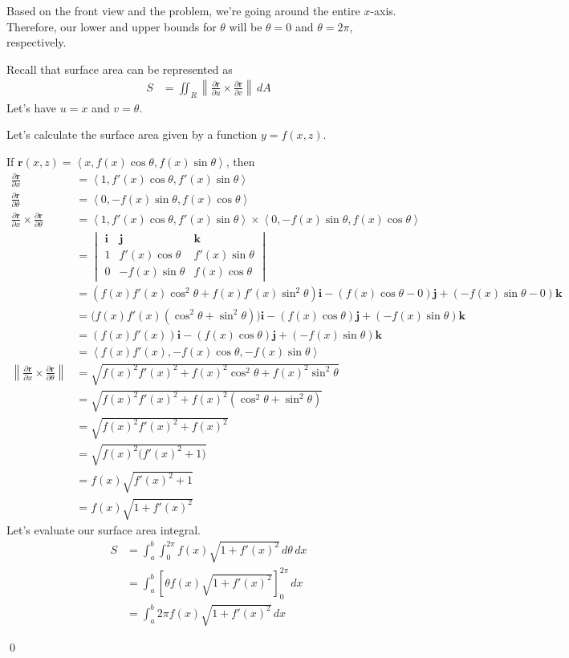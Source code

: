 \documentclass{article}
\newcommand{\lrp}[1]{\left( #1 \right)}
\newcommand{\lra}[1]{\left\langle #1 \right\rangle}
\newcommand{\lrb}[1]{\left[ #1 \right]}
\newcommand{\norm}[1]{\left\lVert #1 \right\rVert}
\renewcommand{\i}[0]{\mathbf{i}}
\renewcommand{\j}[0]{\mathbf{j}}
\renewcommand{\k}[0]{\mathbf{k}}
\renewcommand{\r}[0]{\mathbf{r}}
\begin{document}
Based on the front view and the problem, we're going around the entire $x$-axis. Therefore, our lower and upper bounds for $\theta$ will be $\theta =0$ and $\theta=2\pi$, respectively.

Recall that surface area can be represented as
\begin{align*}
    S&=\iint_R \norm{\frac{\partial \r}{\partial u}\times \frac{\partial \r}{\partial v}}\,dA
\end{align*}
Let's have $u=x$ and $v=\theta$.

Let's calculate the surface area given by a function $y=f(x,z)$.

If $\displaystyle   \r(x,z)=\lra{x,f(x)\cos\theta, f(x)\sin\theta}$, then 
\begin{align*}
    \frac{\partial \r}{\partial x}&=\lra{1, f'(x)\cos\theta, f'(x)\sin\theta}\\
    \frac{\partial \r}{\partial \theta}&=\lra{0,-f(x)\sin\theta, f(x)\cos\theta}\\
     \frac{\partial \r}{\partial x}\times \frac{\partial \r}{\partial \theta}&=\lra{1, f'(x)\cos\theta, f'(x)\sin\theta}\times \lra{0,-f(x)\sin\theta, f(x)\cos\theta}\\
     &=\begin{vmatrix}
     \i &\j & \k\\
     1 & f'(x)\cos\theta & f'(x)\sin\theta\\
     0 & -f(x)\sin\theta & f(x)\cos\theta
     \end{vmatrix}\\
     &=\lrp{f(x)f'(x)\cos^2\theta+f(x)f'(x)\sin^2\theta}\i-\lrp{f(x)\cos\theta-0}\j+\lrp{-f(x)\sin\theta-0}\k\\
     &=\big(f(x)f'(x)\lrp{\cos^2\theta+\sin^2\theta}\big)\i-\lrp{f(x)\cos\theta}\j+\lrp{-f(x)\sin\theta}\k\\
     &=\lrp{f(x)f'(x)}\i-\lrp{f(x)\cos\theta}\j+\lrp{-f(x)\sin\theta}\k\tag{$\cos^2\theta+\sin^2\theta=1$}\\
     &=\lra{f(x)f'(x),-f(x)\cos\theta, -f(x)\sin\theta}\\
     \norm{ \frac{\partial \r}{\partial x}\times \frac{\partial \r}{\partial \theta}}&=\sqrt{f(x)^2f'(x)^2+f(x)^2\cos^2\theta+f(x)^2\sin^2\theta}\\
     &=\sqrt{f(x)^2f'(x)^2+f(x)^2\lrp{\cos^2\theta+\sin^2\theta}}\\
     &=\sqrt{f(x)^2f'(x)^2+f(x)^2}\tag{$\cos^2\theta+\sin^2\theta=1$}\\
     &=\sqrt{f(x)^2\big(f'(x)^2+1\big)}\\
     &=f(x)\sqrt{f'(x)^2+1}\tag{$y=f(x)\geq 0$}\\
     &=f(x)\sqrt{1+f'(x)^2}
\end{align*}
Let's evaluate our surface area integral.
\begin{align*}
    S&=\int_a^b\int_0^{2\pi} f(x)\sqrt{1+f'(x)^2}\,d\theta\,dx\\
    &=\int_a^b \lrb{\theta f(x)\sqrt{1+f'(x)^2}}_0^{2\pi}\,dx\\
    &=\int_a^b 2\pi f(x)\sqrt{1+f'(x)^2}\,dx
\end{align*}

\qed
\end{document}
